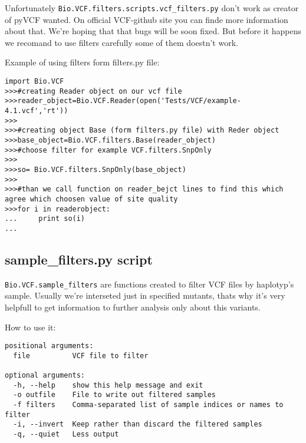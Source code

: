 \noindent Unfortunately \verb|Bio.VCF.filters.scripts.vcf_filters.py| don't work as creator of pyVCF wanted. On official VCF-github site you can finde more information about that. We're hoping that that bugs will be soon fixed. But before it happens we recomand to use filters carefully some of them doestn't work.

\noindent Example of using filters form filters.py file:
\begin{verbatim}
import Bio.VCF
>>>#creating Reader object on our vcf file
>>>reader_object=Bio.VCF.Reader(open('Tests/VCF/example-4.1.vcf','rt'))
>>>
>>>#creating object Base (form filters.py file) with Reder object
>>>base_object=Bio.VCF.filters.Base(reader_object)
>>>#choose filter for example VCF.filters.SnpOnly
>>>
>>>so= Bio.VCF.filters.SnpOnly(base_object)
>>>
>>>#than we call function on reader_bejct lines to find this which agree which choosen value of site quality
>>>for i in readerobject:
...		print so(i)
...
\end{verbatim}


\subsection{sample\_filters.py script}
\noindent \verb|Bio.VCF.sample_filters| are functions created to filter VCF files by haplotyp's sample.
Usually we're interseted just in specified mutants, thats why it's very helpfull to get information to further analysis only about this variants.

\noindent How to use it:

\begin{verbatim}
positional arguments:
  file          VCF file to filter

optional arguments:
  -h, --help    show this help message and exit
  -o outfile    File to write out filtered samples
  -f filters    Comma-separated list of sample indices or names to filter
  -i, --invert  Keep rather than discard the filtered samples
  -q, --quiet   Less output
\end{verbatim}

